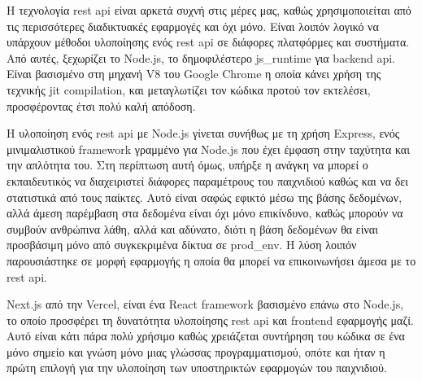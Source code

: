 Η τεχνολογία \acrshort{rest} \acrshort{api} είναι αρκετά συχνή στις μέρες μας, καθώς χρησιμοποιείται από τις περισσότερες διαδικτυακές εφαρμογές και όχι μόνο. Είναι λοιπόν λογικό να υπάρχουν μέθοδοι υλοποίησης ενός \acrshort{rest} \acrshort{api} σε διάφορες πλατφόρμες και συστήματα. Από αυτές, ξεχωρίζει το Node.js\cite{noauthor_nodejs_nodate}, το δημοφιλέστερο \gls{js_runtime} για backend \acrshort{api}. Είναι βασισμένο στη μηχανή V8 του Google Chrome\cite{noauthor_v8_nodate} η οποία κάνει χρήση της τεχνικής \acrshort{jit} compilation, και μεταγλωτίζει τον κώδικα προτού τον εκτελέσει, προσφέροντας έτσι πολύ καλή απόδοση.

Η υλοποίηση ενός \acrshort{rest} \acrshort{api} με Node.js γίνεται συνήθως με τη χρήση Express, ενός μινιμαλιστικού framework γραμμένο για Node.js που έχει έμφαση στην ταχύτητα και την απλότητα του. Στη περίπτωση αυτή όμως, υπήρξε η ανάγκη να μπορεί ο εκπαιδευτικός να διαχειριστεί διάφορες παραμέτρους του παιχνιδιού καθώς και να δει στατιστικά από τους παίκτες. Αυτό είναι σαφώς εφικτό μέσω της βάσης δεδομένων, αλλά άμεση παρέμβαση στα δεδομένα είναι όχι μόνο επικίνδυνο, καθώς μπορούν να συμβούν ανθρώπινα λάθη, αλλά και αδύνατο, διότι η βάση δεδομένων θα είναι προσβάσιμη μόνο από συγκεκριμένα δίκτυα σε \gls{prod_env}. Η λύση λοιπόν παρουσιάστηκε σε μορφή εφαρμογής η οποία θα μπορεί να επικοινωνήσει άμεσα με το \acrshort{rest} \acrshort{api}.

Next.js από την Vercel\cite{noauthor_nextjs_nodate}, είναι ένα React\cite{noauthor_react_nodate} \gls{framework} βασισμένο επάνω στο Node.js, το οποίο προσφέρει τη δυνατότητα υλοποίησης \acrshort{rest} \acrshort{api} και frontend εφαρμογής μαζί. Αυτό είναι κάτι πάρα πολύ χρήσιμο καθώς χρειάζεται συντήρηση του κώδικα σε ένα μόνο σημείο και γνώση μόνο μιας γλώσσας προγραμματισμού, οπότε και ήταν η πρώτη επιλογή για την υλοποίηση των υποστηρικτών εφαρμογών του παιχνιδιού.

